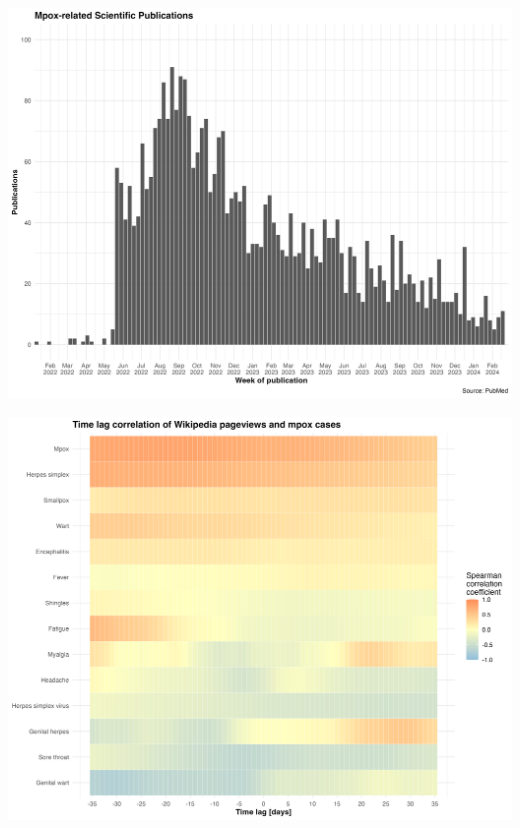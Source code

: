 \documentclass[
  12pt,
]{article}
\begin{document}
\begin{center}
\includegraphics{images/mpox-studies-USA-weekly.png}
\end{center}

\begin{center}
\includegraphics{images/spearman-correlation-heatmap.png}
\end{center}
\end{document}
